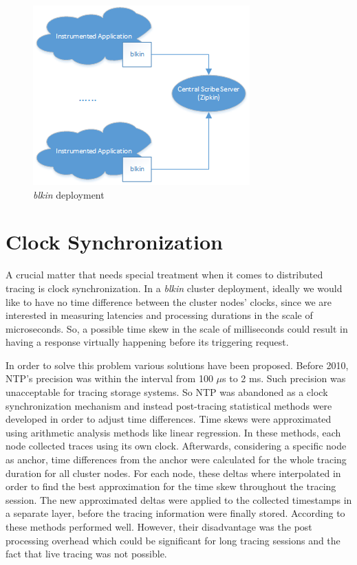 \documentclass[a4paper,10pt,twocolumn]{article}
\begin{document}
\begin{figure}[h!]
  \centering
  \includegraphics[scale=0.75]{images/generic.png}
  \caption{\emph{blkin} deployment}
  \label{fig:generic}
\end{figure}

\section{Clock Synchronization}

A crucial matter that needs special treatment when it comes to distributed
tracing is clock synchronization. In a \emph{blkin} cluster deployment, ideally
we would like to have no time difference between the cluster nodes' clocks,
since we are interested in measuring latencies and processing durations in the
scale of microseconds. So, a possible time skew in the scale of milliseconds
could result in having a response virtually happening before its triggering
request.

In order to solve this problem various solutions have been proposed.  Before
2010, NTP's precision was within the interval from 100 $\mu$s to 2 ms.  Such
precision was unacceptable for tracing storage systems. So NTP was abandoned as
a clock synchronization mechanism and instead post-tracing statistical methods
were developed in order to adjust time differences. Time skews were
approximated using arithmetic analysis methods like linear regression. In these
methods, each node collected traces using its own clock.  Afterwards,
considering a specific node as anchor, time differences from the anchor were
calculated for the whole tracing duration for all cluster nodes.  For each
node, these deltas where interpolated in order to find the best approximation
for the time skew throughout the tracing session. The new approximated deltas
were applied to the collected timestamps in a separate layer, before the
tracing information were finally stored. According to \cite{hp} these methods
performed well. However, their disadvantage was the post processing overhead
which could be significant for long tracing sessions and the fact that live
tracing was not possible.
\end{document}
